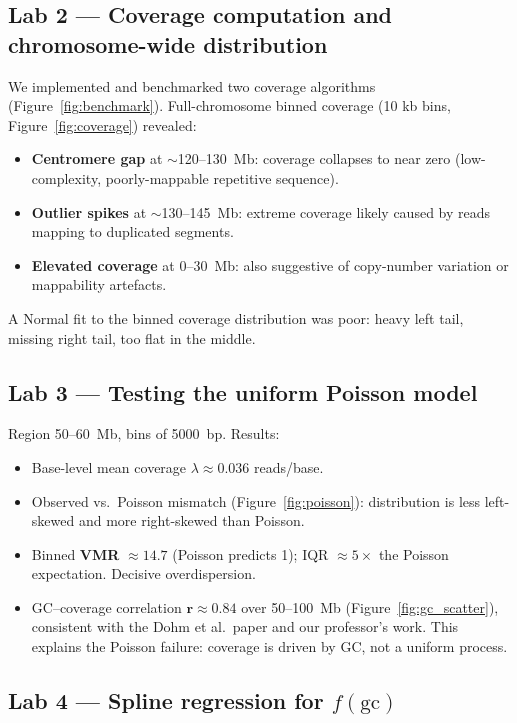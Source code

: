 \documentclass[11pt]{article}
\begin{document}
\subsection{Lab 2 --- Coverage computation and chromosome-wide distribution}

We implemented and benchmarked two coverage algorithms (Figure~\ref{fig:benchmark}).
Full-chromosome binned coverage (10 kb bins, Figure~\ref{fig:coverage}) revealed:
\begin{itemize}[leftmargin=*]
  \item \textbf{Centromere gap} at $\sim$120--130~Mb: coverage collapses to near zero
    (low-complexity, poorly-mappable repetitive sequence).
  \item \textbf{Outlier spikes} at $\sim$130--145~Mb: extreme coverage likely caused
    by reads mapping to duplicated segments.
  \item \textbf{Elevated coverage} at 0--30~Mb: also suggestive of copy-number
    variation or mappability artefacts.
\end{itemize}
A Normal fit to the binned coverage distribution was poor: heavy left tail, missing
right tail, too flat in the middle.

\subsection{Lab 3 --- Testing the uniform Poisson model}

Region 50--60~Mb, bins of 5000~bp. Results:
\begin{itemize}[leftmargin=*]
  \item Base-level mean coverage $\lambda \approx \mathbf{0.036}$ reads/base.
  \item Observed vs.\ Poisson mismatch (Figure~\ref{fig:poisson}): distribution is
    less left-skewed and more right-skewed than Poisson.
  \item Binned \textbf{VMR} $\approx \mathbf{14.7}$ (Poisson predicts 1); IQR
    $\approx 5\times$ the Poisson expectation. Decisive overdispersion.
  \item GC--coverage correlation $\mathbf{r \approx 0.84}$ over 50--100~Mb
    (Figure~\ref{fig:gc_scatter}), consistent with the Dohm et al.\ paper and our
    professor's work. This explains the Poisson failure: coverage is driven by
    GC, not a uniform process.
\end{itemize}

\subsection{Lab 4 --- Spline regression for $f(\text{gc})$}
\end{document}
